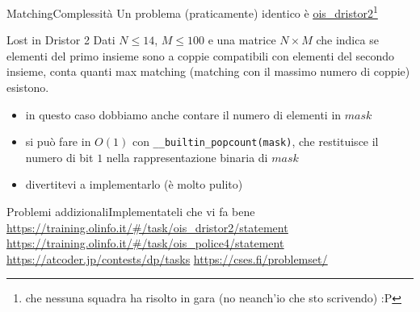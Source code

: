 \documentclass{beamer}
\begin{document}
\begin{frame}
\end{frame}

\begingroup
{}
\begin{frame}{Matching}{Complessit\`a}
    Un problema (praticamente) identico \`e \href{https://training.olinfo.it/\#/task/ois_dristor2/statement}{\underline{ois\_dristor2}}\footnote{che nessuna squadra ha risolto in gara (no neanch'io che sto scrivendo) :P}
    \pause
    \begin{exampleblock}{Lost in Dristor 2}
        Dati $N \leq 14$, $M \leq 100$ e una matrice $N \times M$ che indica se elementi del primo insieme sono a coppie compatibili con elementi del secondo insieme, conta quanti max matching (matching con il massimo numero di coppie) esistono.
    \end{exampleblock}
    \pause
    \begin{itemize}
        \item in questo caso dobbiamo anche contare il numero di elementi in $mask$
        \pause
        \item si pu\`o fare in $O(1)$ con \verb|__builtin_popcount(mask)|, che restituisce il numero di bit $1$ nella rappresentazione binaria di $mask$
        \pause
    \item divertitevi a implementarlo (\`e molto pulito)
    \end{itemize}
\end{frame}
\endgroup

\begin{frame}{Problemi addizionali}{Implementateli che vi fa bene}
    \underline{\url{https://training.olinfo.it/\#/task/ois_dristor2/statement}}
    \underline{\url{https://training.olinfo.it/\#/task/ois_police4/statement}}
    \underline{\url{https://atcoder.jp/contests/dp/tasks}}
    \underline{\url{https://cses.fi/problemset/}}
\end{frame}
\end{document}

